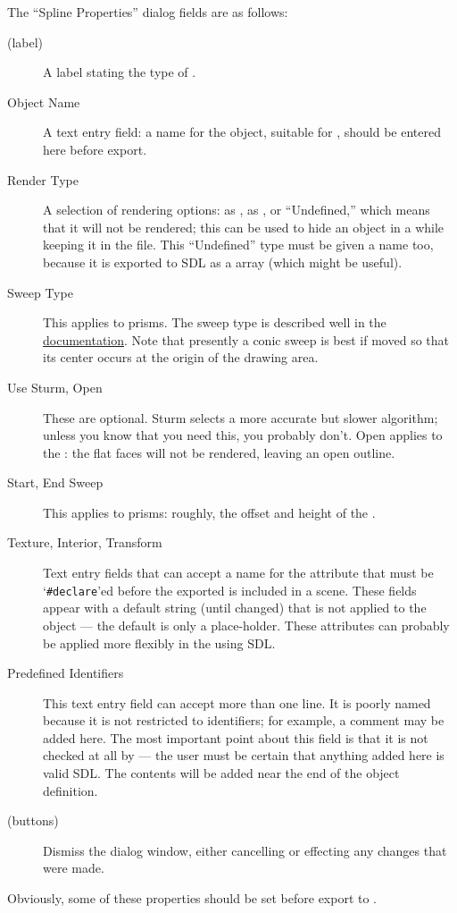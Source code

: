 			The ``Spline Properties'' dialog fields are as follows:
			\begin{description}
			  \item[(label)] A label stating the type of \IXspline{}.
			  \item[Object Name] A text entry field: a name
				for the object, suitable for \IXpov{} ,
				should be entered here before export.
			  \item[Render Type] A selection of rendering options:
				as \IXlathe{}, as \IXprism{}, or ``Undefined,''
				which means that it will not
				be rendered; this can be used to hide an object in
				a \IXpov{}  while keeping it in the
				\IXpkg{} file. This ``Undefined'' type must be given
				a name too, because it is exported to SDL as a \IXpov{}
				array (which might be useful).
			  \item[Sweep Type] This applies to prisms. The sweep
				type is described well in the \IXpov{}
				\href{\URLPOVdocsPrism}{\IXprism{} documentation}.
				Note that presently a conic sweep \IXprism{} is best
				if moved so that its center occurs at the origin
				of the \IXpkg{} drawing area.
			  \item[Use Sturm, Open] These are optional. Sturm selects
				a more accurate but slower algorithm; unless you
				know that you need this, you probably don't.
				Open applies to the \IXprism{}: the flat faces will not
				be rendered, leaving an open outline.
			  \item[Start, End Sweep] This applies to prisms:
				roughly, the offset and height of the \IXprism{}.
			  \item[Texture, Interior, Transform] Text entry
				fields that can accept a name for the attribute
				that must be
				`\verb!#declare!'ed
				before the exported  is included
				in a scene. These fields appear with a default
				string (until changed) that is not applied to
				the object --- the default is only a place-holder.
				These attributes can probably be applied more
				flexibly in the using SDL.				
			  \item[Predefined Identifiers] This text entry field
				can accept more than one line. It is poorly named
				because it is not restricted to identifiers;
				for example, a comment may be added here.
				The most important point about this field is
				that it is not checked at all by \IXpkg{} ---
				the user must be certain that anything added here
				is valid SDL. The contents will be added near the
				end of the object definition.
			  \item[(buttons)] Dismiss the dialog window, either
				cancelling or effecting any changes that were made.
			\end{description}
			Obviously, some of these properties should be set
			before export to .

